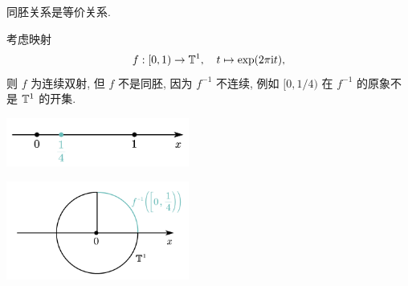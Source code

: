     \begin{Proposition}
        同胚关系是等价关系.
    \end{Proposition}

    \begin{Example}\label{ex:局部同胚不同胚}
        考虑映射
        \begin{align*}
            f: [0, 1)\to \mathbb{T}^{1},\quad t\mapsto \exp(2\pi \mathrm{i} t),
        \end{align*}
        则 $ f $ 为连续双射, 但 $ f $ 不是同胚, 因为 $ f^{-1} $ 不连续, 例如 $ [0, 1/4) $ 在 $ f^{-1} $ 的原象不是 $ \mathbb{T}^{1} $ 的开集.

        \begin{minipage}[c]{.4\textwidth}
            \centering
            \vspace{1em}
            \includegraphics[width=6cm]{figures/TopoFig1.png}
        \end{minipage}\quad
        \begin{minipage}[c]{.4\textwidth}
            \centering
            \vspace{.3em}
            \includegraphics[width=6cm]{figures/TopoFig2.png}
        \end{minipage}
    \end{Example}

